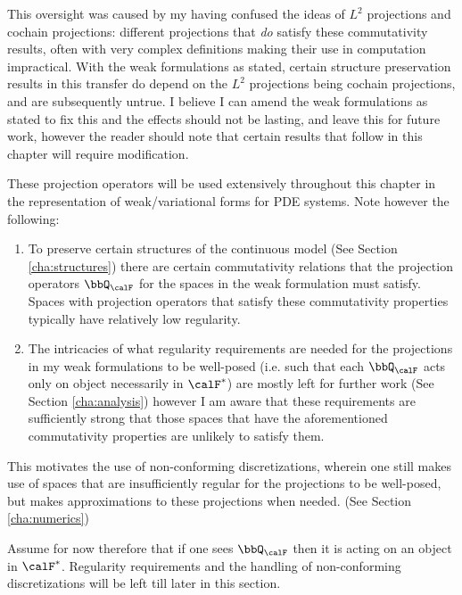 \begin{remark}
        This oversight was caused by my having confused the ideas of $L^{2}$ projections and cochain projections: different projections that \emph{do} satisfy these commutativity results, often with very complex definitions \cite{Falk_Winther_2012} making their use in computation impractical. With the weak formulations as stated, certain structure preservation results in this transfer do depend on the $L^{2}$ projections being cochain projections, and are subsequently untrue. I believe I can amend the weak formulations as stated to fix this and the effects should not be lasting, and leave this for future work, however the reader should note that certain results that follow in this chapter will require modification.
    \end{remark}
    
    \begin{remark}
        These projection operators will be used extensively throughout this chapter in the representation of weak/variational forms for PDE systems. Note however the following:
        \begin{enumerate}
            \item  To preserve certain structures of the continuous model (See Section \ref{cha:structures}) there are certain commutativity relations that the projection operators $\bbQ_{\calF}$ for the spaces in the weak formulation must satisfy. Spaces with projection operators that satisfy these commutativity properties typically have relatively low regularity.
            \item  The intricacies of what regularity requirements are needed for the projections in my weak formulations to be well-posed (i.e. such that each $\bbQ_{\calF}$ acts only on object necessarily in $\calF^{*}$) are mostly left for further work (See Section \ref{cha:analysis}) however I am aware that these requirements are sufficiently strong that those spaces that have the aforementioned commutativity properties are unlikely to satisfy them.
        \end{enumerate}
        This motivates the use of non-conforming discretizations, wherein one still makes use of spaces that are insufficiently regular for the projections to be well-posed, but makes approximations to these projections when needed. (See Section \ref{cha:numerics})
        
        Assume for now therefore that if one sees $\bbQ_{\calF}$ then it is acting on an object in $\calF^{*}$. Regularity requirements and the handling of non-conforming discretizations will be left till later in this section.
    \end{remark}